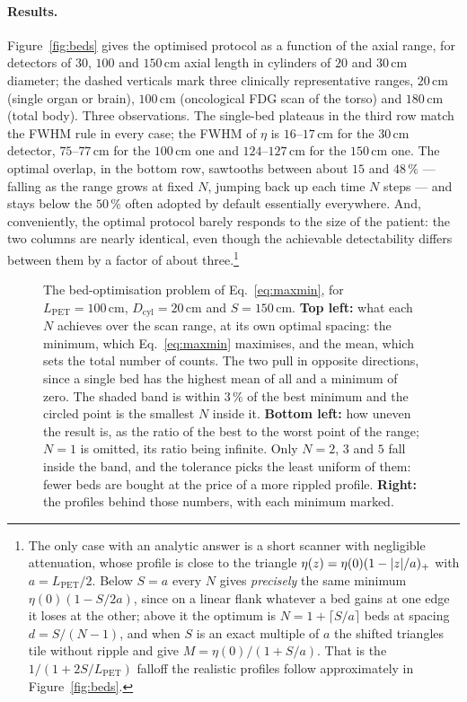 \documentclass[11pt,a4paper]{article}
\newcommand{\Lpet}{L_{\mathrm{PET}}}
\newcommand{\Dcyl}{D_{\mathrm{cyl}}}
\DeclarePairedDelimiter{\abs}{\lvert}{\rvert}
\begin{document}
\paragraph{Results.}
Figure~\ref{fig:beds} gives the optimised protocol as a function of the axial range, for
detectors of $30$, $100$ and $150\,\mathrm{cm}$ axial length in cylinders of $20$ and
$30\,\mathrm{cm}$ diameter; the dashed verticals mark three clinically representative
ranges, $20\,\mathrm{cm}$ (single organ or brain), $100\,\mathrm{cm}$ (oncological FDG scan
of the torso) and $180\,\mathrm{cm}$ (total body). Three observations. The single-bed
plateaus in the third row match the FWHM rule in every case; the FWHM of $\eta$ is
$16$--$17\,\mathrm{cm}$ for the $30\,\mathrm{cm}$ detector, $75$--$77\,\mathrm{cm}$ for the
$100\,\mathrm{cm}$ one and $124$--$127\,\mathrm{cm}$ for the $150\,\mathrm{cm}$ one. The
optimal overlap, in the bottom row, sawtooths between about $15$ and $48\,\%$ --- falling
as the range grows at fixed $N$, jumping back up each time $N$ steps --- and stays below the
$50\,\%$ often adopted by default essentially everywhere. And, conveniently, the optimal protocol
barely responds to the size of the patient: the two columns are nearly identical, even
though the achievable detectability differs between them by a factor of about three.\footnote{The only case with an analytic answer is a short scanner
with negligible attenuation, whose profile is close to the triangle
$\eta(z)=\eta(0)(1-\abs{z}/a)_+$ with $a=\Lpet/2$. Below $S=a$ every $N$ gives
\emph{precisely} the same minimum $\eta(0)(1-S/2a)$, since on a linear flank whatever a bed
gains at one edge it loses at the other; above it the optimum is $N=1+\lceil S/a\rceil$ beds
at spacing $d=S/(N-1)$, and when $S$ is an exact multiple of $a$ the shifted triangles tile
without ripple and give $M=\eta(0)/(1+S/a)$. That is the $1/(1+2S/\Lpet)$ falloff the
realistic profiles follow approximately in Figure~\ref{fig:beds}.}

\begin{figure}[tbp]
\centering

\caption{The bed-optimisation problem of Eq.~\eqref{eq:maxmin}, for
$\Lpet=100\,\mathrm{cm}$, $\Dcyl=20\,\mathrm{cm}$ and $S=150\,\mathrm{cm}$.
\textbf{Top left:} what each $N$ achieves over the scan range, at its own optimal spacing:
the minimum, which Eq.~\eqref{eq:maxmin} maximises, and the mean, which sets the total
number of counts. The two pull in opposite directions, since a single bed has the highest
mean of all and a minimum of zero. The shaded band is within $3\,\%$ of the best minimum
and the circled point is the smallest $N$ inside it. \textbf{Bottom left:} how uneven the
result is, as the ratio of the best to the worst point of the range; $N=1$ is omitted, its
ratio being infinite. Only $N=2$, $3$ and $5$ fall inside the band, and the tolerance
picks the least uniform of them: fewer beds are bought at the price of a more rippled
profile. \textbf{Right:} the profiles behind those numbers, with each minimum marked.}
\label{fig:ripple}
\end{figure}
\end{document}

